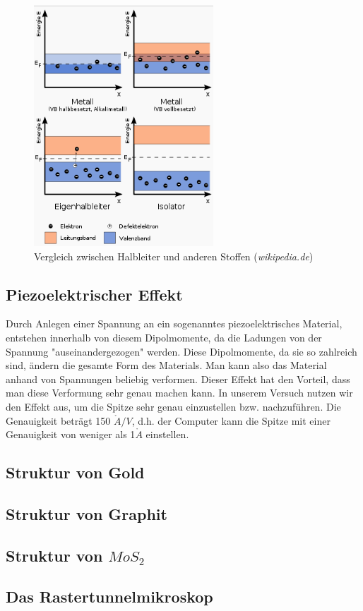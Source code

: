 \begin{figure}[H]
	\centering \includegraphics[width=0.6\textwidth]{Bilder/Halbleiter.png}
	\caption{Vergleich zwischen Halbleiter und anderen Stoffen (\emph{wikipedia.de})}
\end{figure}

\subsection{Piezoelektrischer Effekt}

Durch Anlegen einer Spannung an ein sogenanntes piezoelektrisches Material, entstehen innerhalb von diesem Dipolmomente, da die Ladungen von der Spannung "auseinandergezogen" werden. Diese Dipolmomente, da sie so zahlreich sind, ändern die gesamte Form des Materials. Man kann also das Material anhand von Spannungen beliebig verformen. Dieser Effekt hat den Vorteil, dass man diese Verformung sehr genau machen kann. In unserem Versuch nutzen wir den Effekt aus, um die Spitze sehr genau einzustellen bzw. nachzuführen. Die Genauigkeit beträgt 150 $\mathring A/V$, d.h. der Computer kann die Spitze mit einer Genauigkeit von weniger als 1$\mathring A$ einstellen.

\subsection{Struktur von Gold}


\subsection{Struktur von Graphit}
\subsection{Struktur von $MoS_2$}
\subsection{Das Rastertunnelmikroskop}
